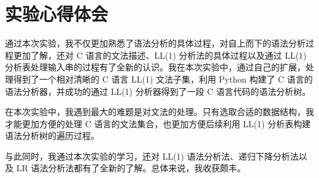 \documentclass[UTF8]{ctexart}
\begin{document}
\section{实验心得体会}
通过本次实验，我不仅更加熟悉了语法分析的具体过程，对自上而下的语法分析过程更加了解，还对 C 语言的文法描述、LL(1) 分析法的具体过程以及通过 LL(1) 分析表处理输入串的过程有了全新的认识。我在本次实验中，通过自己的扩展，处理得到了一个相对清晰的 C 语言 LL(1) 文法子集，利用 Python 构建了 C 语言的语法分析器，并成功的通过 LL(1) 分析器得到了一段 C 语言代码的语法分析树。

在本次实验中，我遇到最大的难题是对文法的处理。只有选取合适的数据结构，我才能更加方便的处理 C 语言的文法集合，也更加方便后续利用 LL(1) 分析表构建语法分析树的遍历过程。

与此同时，我通过本次实验的学习，还对 LL(1) 语法分析法、递归下降分析法以及 LR 语法分析法都有了全新的了解。总体来说，我收获颇丰。
\end{document}
